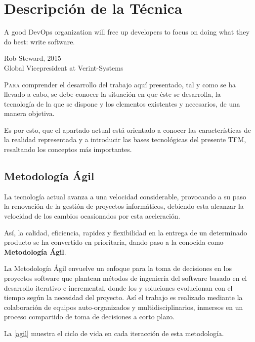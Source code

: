 \chapter{Descripción de la Técnica}\label{chp-02}
\epigraph{A good DevOps organization will free up developers to focus on doing what they do best: write software. }{Rob Steward, 2015\\Global Vicepresident at Verint-Systems}

\lettrine[lraise=-0.1, lines=2, loversize=0.2]{P}{ara} comprender el desarrollo del trabajo aquí presentado, tal y como se ha llevado a cabo, se debe conocer la situación en que éste se desarrolla, la tecnología de la que se dispone y los elementos existentes y necesarios, de una manera objetiva.

Es por esto, que el apartado actual está orientado a conocer las características de la realidad representada y a introducir las bases tecnológicas del presente \gls{TFM}, resaltando los conceptos más importantes.

\section{Metodología Ágil}

La tecnología actual avanza a una velocidad considerable, provocando a su paso la renovación de la gestión de proyectos informáticos, debiendo esta alcanzar la velocidad de los cambios ocasionados por esta aceleración. 

Así, la calidad, eficiencia, rapidez y flexibilidad en la entrega de un determinado producto se ha convertido en prioritaria, dando paso a la conocida como \textbf{Metodología Ágil}.

La Metodología Ágil envuelve un enfoque para la toma de decisiones en los proyectos software que plantean métodos de ingeniería del software basado en el desarrollo iterativo e incremental, donde los y  soluciones evolucionan con el tiempo según la necesidad del proyecto. Así el trabajo es realizado mediante la colaboración de equipos auto-organizados y multidisciplinarios, inmersos en un proceso compartido de toma de decisiones a corto plazo\cite{vera2014}.

La \autoref{agil} muestra el ciclo de vida en cada iteracción de esta metodología.

